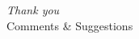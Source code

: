 \documentclass{beamer}
\begin{document}

	\begin{frame}{}
	\centering \Huge
	\emph{Thank you}\\
	\vspace{0.5cm}
	\small
	Comments \& Suggestions
	\end{frame}
\end{document}
